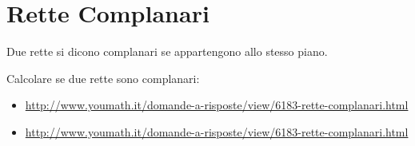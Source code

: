 \section{Rette Complanari}
\begin{definizione}
Due rette si dicono complanari se appartengono allo stesso piano.
\end{definizione}
	
\begin{osservazione}
Calcolare se due rette sono complanari:
\begin{itemize}
 \item \url{http://www.youmath.it/domande-a-risposte/view/6183-rette-complanari.html}
\end{itemize}
\end{osservazione}

\begin{osservazione}
\begin{itemize}
 \item \url{http://www.youmath.it/domande-a-risposte/view/6183-rette-complanari.html}
\end{itemize}
\end{osservazione}


